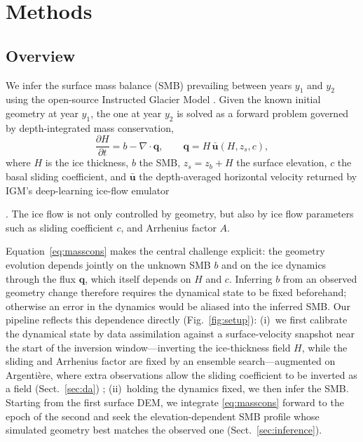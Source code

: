 \section{Methods}\label{sec:methods}

\subsection{Overview}\label{sec:overview}

We infer the surface mass balance (SMB) prevailing between years $y_1$ and $y_2$ using the open-source Instructed Glacier Model
\citep[IGM;][]{jouvet2023, jouvet_cordonnier2023}. Given the known initial geometry at year $y_1$, the one at year $y_2$ is solved as a forward problem governed by depth-integrated mass conservation,
\begin{equation}
  \frac{\partial H}{\partial t} = b - \nabla\cdot\mathbf{q},
  \qquad
  \mathbf{q} = H\,\bar{\mathbf{u}}(H, z_s, c),
  \label{eq:masscons}
\end{equation}
where $H$ is the ice thickness, $b$ the SMB, $z_s = z_b + H$ the surface elevation, $c$ the basal sliding coefficient, and $\bar{\mathbf{u}}$ the depth-averaged horizontal velocity returned by IGM's deep-learning ice-flow emulator \citep{jouvet_cordonnier2023}

. The ice flow is not only controlled by geometry, but also by ice flow parameters such as sliding coefficient $c$, and Arrhenius factor $A$.

Equation~\eqref{eq:masscons} makes the central challenge explicit: the geometry evolution depends jointly on the unknown SMB $b$ and on the ice dynamics through the flux $\mathbf{q}$, which itself depends on $H$ and $c$. Inferring $b$ from an observed geometry change therefore requires the dynamical state to be fixed beforehand; otherwise an error in the dynamics would be aliased into the inferred
SMB. Our pipeline reflects this dependence directly (Fig.~\ref{fig:setup}):
(i)~we first calibrate the dynamical state by data assimilation against a
surface-velocity snapshot near the start of the inversion window---inverting the
ice-thickness field $H$, while the sliding and Arrhenius factor are fixed by an
ensemble search---augmented on Argentière, where extra observations allow the
sliding coefficient to be inverted as a field (Sect.~\ref{sec:da})
; (ii)~holding the
dynamics fixed, we then infer the SMB. Starting from the first surface DEM, we
integrate \eqref{eq:masscons} forward to the epoch of the second and seek the
elevation-dependent SMB profile whose simulated geometry best matches the observed
one (Sect.~\ref{sec:inference}).


